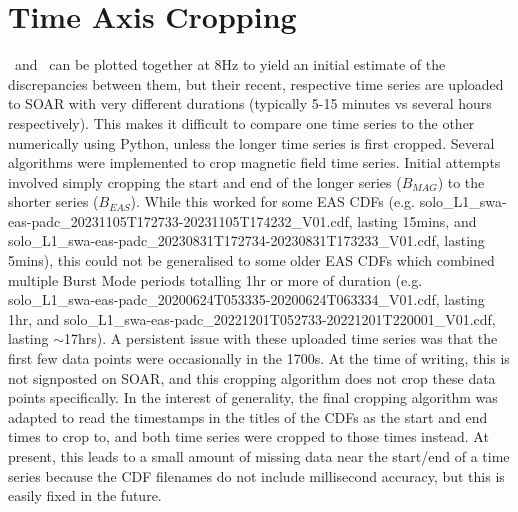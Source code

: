 \section{Time Axis Cropping}
\Beas\ and \Bmag\ can be plotted together at 8Hz to yield an initial estimate of the discrepancies between them, but their recent, respective time series are uploaded to SOAR with very different durations (typically 5-15 minutes vs several hours respectively). This makes it difficult to compare one time series to the other numerically using Python, unless the longer time series is first cropped.  Several algorithms were implemented to crop magnetic field time series. Initial attempts involved simply cropping the start and end of the longer series  (\(B_{MAG}\)) to the shorter series (\(B_{EAS}\)). While this worked for some EAS CDFs (e.g. solo\_L1\_swa-eas-padc\_20231105T172733-20231105T174232\_V01.cdf, lasting 15mins, and solo\_L1\_swa-eas-padc\_20230831T172734-20230831T173233\_V01.cdf, lasting 5mins), this could not be generalised to some older EAS CDFs which combined multiple Burst Mode periods totalling 1hr or more of duration (e.g. solo\_L1\_swa-eas-padc\_20200624T053335-20200624T063334\_V01.cdf, lasting 1hr, and solo\_L1\_swa-eas-padc\_20221201T052733-20221201T220001\_V01.cdf, lasting \(\sim\)17hrs). A persistent issue with these uploaded time series was that the first few data points were occasionally in the 1700s. At the time of writing, this is not signposted on SOAR, and this cropping algorithm does not crop these data points specifically. In the interest of generality, the final cropping algorithm was adapted to read the timestamps in the titles of the CDFs as the start and end times to crop to, and both time series were cropped to those times instead. At present, this leads to a small amount of missing data near the start/end of a time series because the CDF filenames do not include millisecond accuracy, but this is easily fixed in the future.
\\

